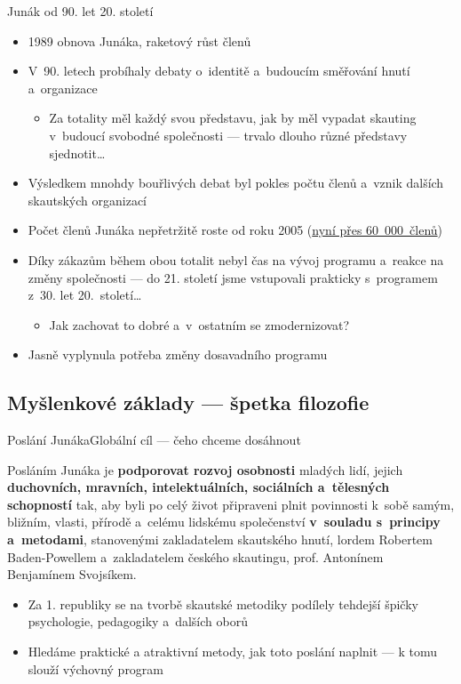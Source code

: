 \documentclass[compress, ucs, xelatex, xcolor=dvipsnames, print,
  hyperref={
    bookmarks=true,
    unicode=true,
    colorlinks=true,
    plainpages=false,
    pdfkeywords={Junak, Pedagogika, Skaut, Skauting, Vychovna metoda},
    linkcolor=Black,
    anchorcolor=Black,
    citecolor=OliveGreen,
    filecolor=OliveGreen,
    menucolor=Black,
    urlcolor=OliveGreen,
    pdftex}
  ]{beamer}
\begin{document}
\begin{frame}{Junák od 90. let 20. století}
  \begin{itemize}
    \item 1989 obnova Junáka, raketový růst členů
    \item V~90. letech probíhaly debaty o~identitě a~budoucím směřování hnutí a~organizace
    \begin{itemize}
      \item Za totality měl každý svou představu, jak by měl vypadat skauting v~budoucí svobodné společnosti --- trvalo dlouho různé představy sjednotit\ldots
    \end{itemize}
    \item Výsledkem mnohdy bouřlivých debat byl pokles počtu členů a~vznik dalších skautských organizací
    \item Počet členů Junáka nepřetržitě roste od roku 2005 (\href{https://www.skaut.cz/skauting/o-skautingu/fakta-cisla}{nyní přes 60~000~členů})
    \item Díky zákazům během obou totalit nebyl čas na vývoj programu a~reakce na změny společnosti --- do 21. století jsme vstupovali prakticky s~programem z~30. let 20.~století\ldots
    \begin{itemize}
      \item Jak zachovat to dobré a~v~ostatním se zmodernizovat?
    \end{itemize}
    \item Jasně vyplynula potřeba změny dosavadního programu
  \end{itemize}
\end{frame}

\subsection{Myšlenkové základy --- špetka filozofie}

\begin{frame}{Poslání Junáka}{Globální cíl --- čeho chceme dosáhnout}
  \begin{center}
    \begin{Large}
      Posláním Junáka je \textbf{podporovat rozvoj osobnosti} mladých lidí, jejich \textbf{duchovních, mravních, intelektuálních, sociálních a~tělesných schopností} tak, aby byli po celý život připraveni plnit povinnosti k~sobě samým, bližním, vlasti, přírodě a~celému lidskému společenství \textbf{v~souladu s~principy a~metodami}, stanovenými zakladatelem skautského hnutí, lordem Robertem Baden-Powellem a~zakladatelem českého skautingu, prof. Antonínem Benjamínem Svojsíkem.
    \end{Large}
  \end{center}
  \begin{itemize}
    \item Za 1. republiky se na tvorbě skautské metodiky podílely tehdejší špičky psychologie, pedagogiky a~dalších oborů
    \item Hledáme praktické a atraktivní metody, jak toto poslání naplnit --- k tomu slouží výchovný program
  \end{itemize}
\end{frame}
\end{document}
